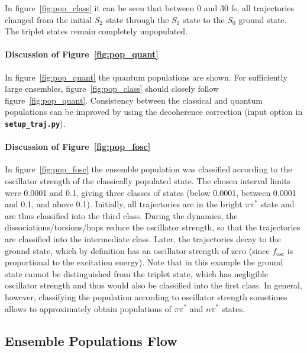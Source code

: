 \documentclass[a4paper,11pt,DIV=15,openany]{scrbook}
\makeatletter
\newcommand{\refermanual}[2][rectangle,draw=B,thick,fill=black!5,inner sep=1pt,outer sep=0pt,rounded corners]{\marginpar{\tikz[baseline=(current bounding box.north)]\node at (0,0) [#1]{\begin{tabular}{@{}l@{}}See\\ section\\ \ref*{#2}\\ (p. \pageref*{#2})\\ in the\\ manual.\end{tabular}};}}
\newcommand{\ttt}[1]{\textbf{\texttt{#1}}}
\makeatother
\begin{document}
In figure~\ref{fig:pop_class} it can be seen that between 0 and 30 fs, all trajectories changed from the initial $S_2$ state through the $S_1$ state to the $S_0$ ground state. The triplet states remain completely unpopulated. 

\paragraph{Discussion of Figure~\ref{fig:pop_quant}}

In figure~\ref{fig:pop_quant} the quantum populations are shown. For sufficiently large ensembles, figure~\ref{fig:pop_class} should closely follow figure~\ref{fig:pop_quant}. Consistency between the classical and quantum populations can be improved by using the decoherence correction (input option in \ttt{setup\_traj.py}).

\paragraph{Discussion of Figure~\ref{fig:pop_fosc}}

In figure~\ref{fig:pop_fosc} the ensemble population was classified according to the oscillator strength of the classically populated state. 
The chosen interval limits were 0.0001 and 0.1, giving three classes of states (below 0.0001, between 0.0001 and 0.1, and above 0.1). 
Initially, all trajectories are in the bright $\pi\pi^*$ state and are thus classified into the third class. 
During the dynamics, the dissociations/torsions/hops reduce the oscillator strength, so that the trajectories are classified into the intermediate class.
Later, the trajectories decay to the ground state, which by definition has an oscillator strength of zero (since $f_\text{osc}$ is proportional to the excitation energy). 
Note that in this example the ground state cannot be distinguished from the triplet state, which has negligible oscillator strength and thus would also be classified into the first class.
In general, however, classifying the population according to oscillator strength sometimes allows to approximately obtain populations of $\pi\pi^*$ and $n\pi^*$ states.










\clearpage
\subsection{Ensemble Populations Flow}
\refermanual{m-sec:transition.py}
\end{document}

